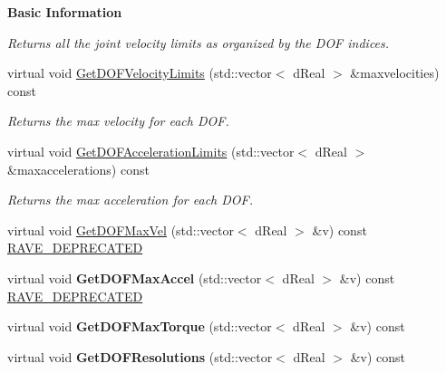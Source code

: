 \begin{Indent}{\bf Basic Information}
\begin{DoxyCompactItemize}
\begin{DoxyCompactList}\small\item\em Returns all the joint velocity limits as organized by the DOF indices. \item\end{DoxyCompactList}\item 
\hypertarget{classOpenRAVE_1_1KinBody_a235492faf314ece039e652cb7493ef32}{
virtual void \hyperlink{classOpenRAVE_1_1KinBody_a235492faf314ece039e652cb7493ef32}{GetDOFVelocityLimits} (std::vector$<$ dReal $>$ \&maxvelocities) const }
\label{classOpenRAVE_1_1KinBody_a235492faf314ece039e652cb7493ef32}

\begin{DoxyCompactList}\small\item\em Returns the max velocity for each DOF. \item\end{DoxyCompactList}\item 
\hypertarget{classOpenRAVE_1_1KinBody_ad463b766576c1691d2937c43d53ec61b}{
virtual void \hyperlink{classOpenRAVE_1_1KinBody_ad463b766576c1691d2937c43d53ec61b}{GetDOFAccelerationLimits} (std::vector$<$ dReal $>$ \&maxaccelerations) const }
\label{classOpenRAVE_1_1KinBody_ad463b766576c1691d2937c43d53ec61b}

\begin{DoxyCompactList}\small\item\em Returns the max acceleration for each DOF. \item\end{DoxyCompactList}\item 
virtual void \hyperlink{classOpenRAVE_1_1KinBody_a1e9ec62d458f7c3b1ea298fa0499b25e}{GetDOFMaxVel} (std::vector$<$ dReal $>$ \&v) const \hyperlink{namespaceOpenRAVE_af23fc4c2c72950a8c02f38ef71680bc6}{RAVE\_\-DEPRECATED}
\item 
\hypertarget{classOpenRAVE_1_1KinBody_a6fe001f451547229641f352a57cac7c0}{
virtual void {\bfseries GetDOFMaxAccel} (std::vector$<$ dReal $>$ \&v) const \hyperlink{namespaceOpenRAVE_af23fc4c2c72950a8c02f38ef71680bc6}{RAVE\_\-DEPRECATED}}
\label{classOpenRAVE_1_1KinBody_a6fe001f451547229641f352a57cac7c0}

\item 
\hypertarget{classOpenRAVE_1_1KinBody_a30e259c711d606c9d38591da2c169ca8}{
virtual void {\bfseries GetDOFMaxTorque} (std::vector$<$ dReal $>$ \&v) const }
\label{classOpenRAVE_1_1KinBody_a30e259c711d606c9d38591da2c169ca8}

\item 
\hypertarget{classOpenRAVE_1_1KinBody_a8179efee098a3632e86cd3e278e89781}{
virtual void {\bfseries GetDOFResolutions} (std::vector$<$ dReal $>$ \&v) const }
\label{classOpenRAVE_1_1KinBody_a8179efee098a3632e86cd3e278e89781}


\end{DoxyCompactItemize}
\end{Indent}
